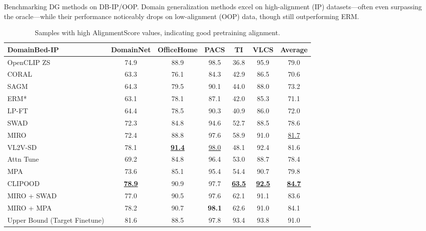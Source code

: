 \documentclass{article} %
\begin{document}
\begin{table}[H]
\setlength{\tabcolsep}{4pt}
\caption{Benchmarking DG methods on DB-IP/OOP. Domain generalization methods excel on high-alignment (IP) datasets—often even surpassing the oracle—while their performance noticeably drops on low-alignment (OOP) data, though still outperforming ERM. }
\small
\centering
\begin{subtable}[t]{1\textwidth}
\centering
\begin{tabular}{lcccccc}
\toprule
\textbf{DomainBed-IP} & DomainNet & OfficeHome & PACS & TI & VLCS & Average \\ \midrule
OpenCLIP ZS &  74.9 & 88.9 & 98.5 & 36.8&95.9 & 79.0\\ \midrule 
CORAL~\citep{sun2016deep} & 63.3 & 76.1 & 84.3 & 42.9 & 86.5 & 70.6 \\ 
SAGM~\citep{wang2023sharpness} & 64.3 & 79.5 & 90.1 & 44.0 & 88.0 & 73.2 \\ 
ERM*~\citep{gulrajani2020search} & 63.1 & 78.1 & 87.1 & 42.0 & 85.3 & 71.1 \\ 
LP-FT~\citep{kumar2021fine} & 64.4 & 78.5 & 90.3 & 40.9 & 86.0 & 72.0 \\ 
SWAD~\citep{cha2021swad} & 72.3 & 84.8 & 94.6 & 52.7 & 88.5 & 78.6 \\ 
MIRO~\citep{cha2022miro} & 72.4 & 88.8 & 97.6 & 58.9 & 91.0 & \underline{81.7} \\ 
VL2V-SD~\citep{addepalli2024leveraging} & 78.1 & \underline{\textbf{91.4}} & \underline{98.0} & 48.1 & 92.4 & 81.6 \\ 
Attn Tune~\citep{teterwak2023erm++} & 69.2 & 84.8 & 96.4 & 53.0 & 88.7 & 78.4 \\ 
MPA~\citep{arpit2022ensemble} & 73.6 & 85.1 & 95.4 & 54.4 & 90.7 & 79.8 \\ 
CLIPOOD~\citep{shu2023clipood} & \textbf{\underline{78.9}}  & 90.9  & 97.7 & \textbf{\underline{63.5}} & \textbf{\underline{92.5}}  & \textbf{\underline{84.7}} \\
\midrule
MIRO + SWAD &77.0 & 90.5 & 97.6 & 62.1 & 91.1 & 83.6 \\
MIRO + MPA & 78.2 & 90.7 & \textbf{98.1} & 62.6 & 91.0 & 84.1\\ \midrule
Upper Bound (Target Finetune) & 81.6 & 88.5 & 97.8 & 93.4 & 93.8 &  91.0 \\ \bottomrule
\end{tabular}
\caption{Samples with high AlignmentScore values, indicating good pretraining alignment.}
\end{subtable}
\vspace{10pt}


\end{table}
\end{document}
